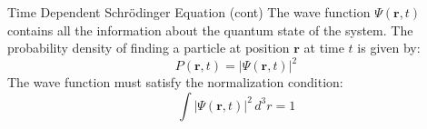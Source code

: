 \begin{frame}{Time Dependent Schrödinger Equation (cont)}
	The wave function $\Psi(\mathbf{r}, t)$ contains all the information about the quantum state of the system. The probability density of finding a particle at position $\mathbf{r}$ at time $t$ is given by:
	\begin{equation*}
		P(\mathbf{r}, t) = |\Psi(\mathbf{r}, t)|^2
	\end{equation*}
	The wave function must satisfy the normalization condition:
	\begin{equation*}
		\int |\Psi(\mathbf{r}, t)|^2 \, d^3r = 1
	\end{equation*}
\end{frame}
